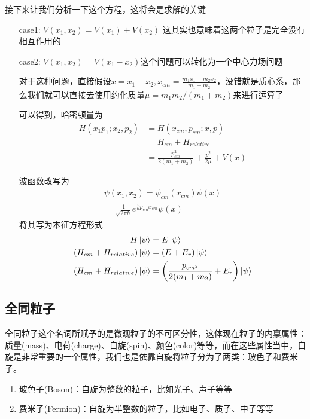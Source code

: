 \documentclass{article}
\begin{document}
接下来让我们分析一下这个方程，这将会是求解的关键
\begin{enumerate}
    \item[case1:] $V(x_1,x_2)=V(x_1)+V(x_2)$ 这其实也意味着这两个粒子是完全没有相互作用的
    \item[case2:] $V(x_1,x_2)=V(x_1-x_2)$这个问题可以转化为一个中心力场问题
    
    对于这种问题，直接假设$\displaystyle x=x_1-x_2,x_{cm}=\frac{m_1x_1+m_2x_2}{m_1+m_2}$，没错就是质心系，那么我们就可以直接去使用约化质量$\mu=m_1m_2/(m_1+m_2)$来进行运算了

    可以得到，哈密顿量为
    \begin{align*}
        H(x_1p_1;x_2,p_2)&=H(x_{cm},p_{cm};x,p)\\
        &=H_{cm}+H_{relative}\\
        &=\frac{p_{cm}^2}{2(m_1+m_2)}+\frac{p^2}{2\mu}+V(x)
    \end{align*}

    波函数改写为
    \begin{align*}
        \psi(x_1,x_2)=\psi_{cm}(x_{cm})\psi(x)\\
        =\frac{1}{\sqrt{2\pi\hbar}}e^{\frac{i}{\hbar}p_{cm}x_{cm}}\psi(x)
    \end{align*}
    将其写为本征方程形式
    \begin{align*}
        H\ket{\psi}&=E\ket{\psi}\\
        (H_{cm}+H_{relative})\ket{\psi}&=(E+E_r)\ket{\psi}\\
        (H_{cm}+H_{relative})\ket{\psi}&=\left(\frac{p_{cm^2}}{2(m_1+m_2)}+E_r\right)\ket{\psi}
    \end{align*}
\end{enumerate}


\subsection{全同粒子}
全同粒子这个名词所赋予的是微观粒子的不可区分性，这体现在粒子的内禀属性：质量(mass)、电荷(charge)、自旋(spin)、颜色(color)等等，而在这些属性当中，自旋是非常重要的一个属性，我们也是依靠自旋将粒子分为了两类：玻色子和费米子。

\begin{enumerate}
    \item 玻色子(Boson)：自旋为整数的粒子，比如光子、声子等等
    \item 费米子(Fermion)：自旋为半整数的粒子，比如电子、质子、中子等等
\end{enumerate}
\end{document}
